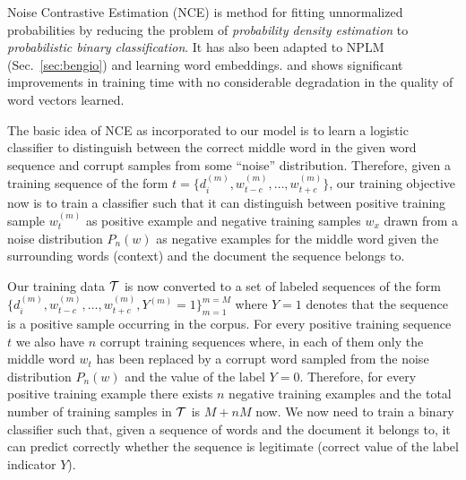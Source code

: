 Noise Contrastive Estimation (NCE) \citep{gutmann2012noise} is method for fitting unnormalized probabilities by reducing the problem of \emph{probability density estimation} to \emph{probabilistic binary classification}. It has also been adapted to NPLM (Sec.~\ref{sec:bengio}) \citep{mnih2012fast} and learning word embeddings. \cite{mnih2013learning} and shows significant improvements in training time with no considerable degradation in the quality of word vectors learned.

The basic idea of NCE as incorporated to our model is to learn a logistic classifier to distinguish between the correct middle word in the given word sequence and corrupt samples from some ``noise'' distribution. Therefore, given a training sequence of the form $t = \{d^{(m)}_{i}, w^{(m)}_{t-c}, \ldots, w^{(m)}_{t+c}\}$, our training objective now is to train a classifier such that it can distinguish between positive training sample $w^{(m)}_{t}$ as positive example and negative training samples $w_{x}$ drawn from a noise distribution $P_{n}(w)$ as negative examples for the middle word given the surrounding words (context) and the document the sequence belongs to.

Our training data $\mathcal{T}$ is now converted to a set of labeled sequences of the form 
$ \{d^{(m)}_{i}, w^{(m)}_{t-c}, \ldots, w^{(m)}_{t+c}, Y^{(m)}=1\}^{m=M}_{m=1} $
where $Y=1$ denotes that the sequence is a positive sample occurring in the corpus. 
For every positive training sequence $t$ we also have $n$ corrupt training sequences where, in each of them only the middle word $w_{t}$ has been replaced by a corrupt word sampled from the noise distribution $P_{n}(w)$ and the value of the label $Y=0$. 
Therefore, for every positive training example there exists $n$ negative training examples and the total number of training samples in $\mathcal{T}$ is $M + nM$ now. 
We now need to train a binary classifier such that, given a sequence of words and the document it belongs to, it can predict correctly whether the sequence is legitimate (correct value of the label indicator $Y$). 

